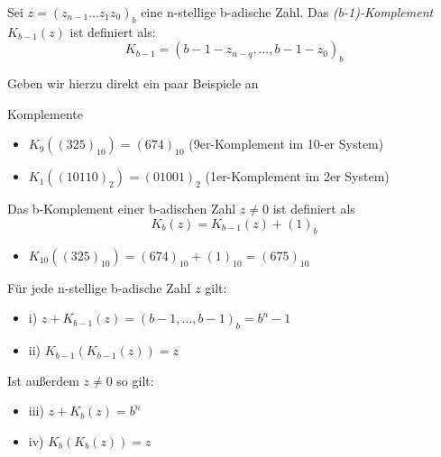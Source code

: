 \begin{definition}[(b-1)-Komplement]
Sei $z=(z_{n-1}\ldots z_1 z_0)_b$ eine n-stellige b-adische Zahl. Das \emph{(b-1)-Komplement} $K_{b-1}(z)$ ist definiert als:
\[
K_{b-1} = (b-1-z_{n-q},\ldots, b-1-z_0)_b
\]
\end{definition}
Geben wir hierzu direkt ein paar Beispiele an
\begin{example} Komplemente \\
\begin{itemize}
	\item $K_9((325)_{10})= (674)_{10}$  (9er-Komplement im 10-er System)
	\item $K_1((10110)_2)=(01001)_2$ (1er-Komplement im 2er System)
\end{itemize}
\end{example}
\begin{definition}[b-Komplement]
Das b-Komplement einer b-adischen Zahl $z\neq 0$ ist definiert als \[
K_b(z)=K_{b-1}(z) +(1)_b
\]
\end{definition}
\begin{example}
\begin{itemize}
	\item $K_{10}((325)_{10}) = (674)_{10} + (1)_{10} = (675)_{10}$
\end{itemize}
\end{example}
\begin{lemma}[]
Für jede n-stellige b-adische Zahl $z$ gilt:
\begin{itemize}
	
	\item i) $z+K_{b-1}(z)=(b-1,\ldots,b-1)_b = b^{n}-1$
	\item ii) $K_{b-1}\left( K_{b-1}(z) \right)=z$
\end{itemize}
Ist außerdem $z\neq 0$ so gilt:
\begin{itemize}
	
	\item iii) $z+K_b(z)=b^{n}$
	\item iv) $K_b(K_b(z))=z$
\end{itemize}
\end{lemma}
